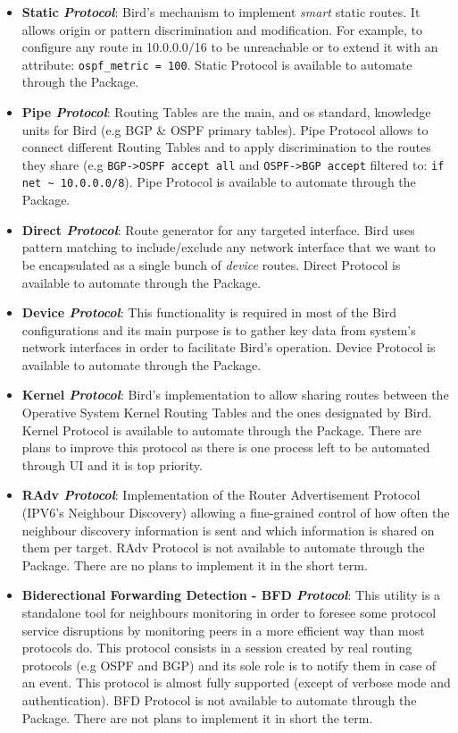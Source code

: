 \begin{itemize}
    \item \textbf{Static \textit{Protocol}}: Bird's mechanism to implement \textit{smart} static routes. It allows  origin or pattern discrimination and modification. For example, to configure any route in 10.0.0.0/16 to be unreachable or to extend it with an attribute: \texttt{ospf\_metric = 100}.
    Static Protocol is available to automate through the Package.
    \item \textbf{Pipe \textit{Protocol}}: Routing Tables are the main, and \acrshort{os} standard, knowledge units for Bird (e.g BGP \& OSPF primary tables). Pipe Protocol allows to connect different Routing Tables and to apply discrimination to the routes they share (e.g \texttt{BGP->OSPF accept all} and \texttt{OSPF->BGP accept} filtered to: \texttt{if net \~{} 10.0.0.0/8}).
    Pipe Protocol is available to automate through the Package.
    \item \textbf{Direct \textit{Protocol}}: Route generator for any targeted interface. Bird uses pattern matching to include/exclude any network interface that we want to be encapsulated as a single bunch of \textit{device} routes.
    Direct Protocol is available to automate through the Package.
    \item \textbf{Device \textit{Protocol}}: This functionality is required in most of the Bird configurations and its main purpose is to gather key data from system's network interfaces in order to facilitate Bird's operation.
    Device Protocol is available to automate through the Package.
    \item \textbf{Kernel \textit{Protocol}}: Bird's implementation to allow sharing routes between the Operative System Kernel Routing Tables and the ones designated by Bird.
    Kernel Protocol is available to automate through the Package. There are plans to improve this protocol as there is one process left to be automated through UI and it is top priority.
    \item \textbf{RAdv \textit{Protocol}}: Implementation of the Router Advertisement Protocol (IPV6's Neighbour Discovery) allowing a fine-grained control of how often the neighbour discovery information is sent and which information is shared on them per target.
    RAdv Protocol is not available to automate through the Package. There are no plans to implement it in the short term. 
    \item \textbf{Biderectional Forwarding Detection - BFD \textit{Protocol}}: This utility is a standalone tool for neighbours monitoring in order to foresee some protocol service disruptions by monitoring peers in a more efficient way than most protocols do. This protocol consists in a session created by real routing protocols (e.g OSPF and BGP) and its sole role is to notify them in case of an event. This protocol is almost fully supported (except of verbose mode and authentication).
    BFD Protocol is not available to automate through the Package. There are not plans to implement it in short the term.
\end{itemize}

